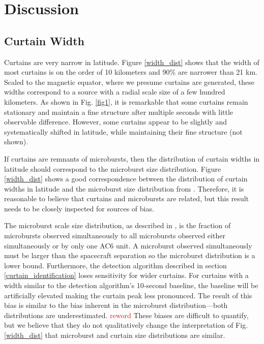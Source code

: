 \documentclass[draft]{agujournal2019}
\begin{document}
\section{Discussion} \label{discussion}
\subsection{Curtain Width}
Curtains are very narrow in latitude. Figure \ref{width_dist} shows that the width of most curtains is on the order of 10 kilometers and 90\% are narrower than 21 km. Scaled to the magnetic equator, where we presume curtains are generated, these widths correspond to a source with a radial scale size of a few hundred kilometers. As shown in Fig. \ref{fig1}, it is remarkable that some curtains remain stationary and maintain a fine structure after multiple seconds with little observable difference. However, some curtains appear to be slightly and systematically shifted in latitude, while maintaining their fine structure (not shown).

If curtains are remnants of microbursts, then the distribution of curtain widths in latitude should correspond to the microburst size distribution. Figure \ref{width_dist} shows a good correspondence between the distribution of curtain widths in latitude and the microburst size distribution from . Therefore, it is reasonable to believe that curtains and microbursts are related, but this result needs to be closely inspected for sources of bias. 

The microburst scale size distribution, as described in , is the fraction of microbursts observed simultaneously to all microbursts observed either simultaneously or by only one AC6 unit. A microburst observed simultaneously must be larger than the spacecraft separation so the microburst distribution is a lower bound. Furthermore, the detection algorithm described in section \ref{curtain_identification} loses sensitivity for wider curtains. For curtains with a width similar to the detection algorithm’s 10-second baseline, the baseline will be artificially elevated making the curtain peak less pronounced. The result of this bias is similar to the bias inherent in the microburst distribution---both distributions are underestimated. \textcolor{red}{reword} These biases are difficult to quantify, but we believe that they do not qualitatively change the interpretation of Fig. \ref{width_dist} that microburst and curtain size distributions are similar.
\end{document}
